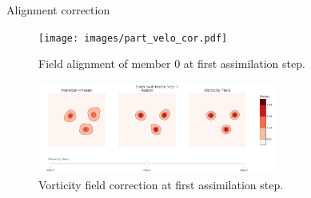 \documentclass[aspectratio=169]{beamer} %
\begin{document}
\begin{frame}{Alignment correction}
    \begin{figure}
        \centering
        \texttt{[image: images/part\_velo\_cor.pdf]}
        \caption*{\tiny Field alignment of member 0 at first assimilation step.}
    \end{figure}
    \vspace{-0.25cm}
    \begin{figure}
        \centering
        \includegraphics[width=0.7\textwidth]{images/mean_vorticity.pdf}
        \caption*{\tiny Vorticity field correction at first assimilation step.}
    \end{figure}
    \vspace{-0.25cm}
\end{frame}
\end{document}
